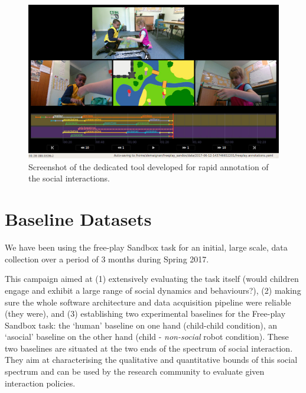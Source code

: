 \documentclass[sigconf]{acmart}
\begin{document}
\begin{figure}
    \centering
    \includegraphics[width=\columnwidth]{annotator}
    \caption{Screenshot of the dedicated tool developed for rapid annotation of
    the social interactions.}
    \label{annotator}
\end{figure}


\section{Baseline Datasets}
\label{sec:dataset}

We have been using the free-play Sandbox task for an initial, large scale, data
collection over a period of 3 months during Spring 2017.

This campaign aimed at (1) extensively evaluating the task itself (would
children engage and exhibit a large range of social dynamics and behaviours?),
(2) making sure the whole software architecture and data acquisition pipeline
were reliable (they were), and (3) establishing two experimental baselines for
the Free-play Sandbox task: the `human' baseline on one hand (child-child
condition), an `asocial' baseline on the other hand (child - \emph{non-social}
robot condition). These two baselines are situated at the two ends of the
spectrum of social interaction. They aim at characterising the qualitative and
quantitative bounds of this social spectrum and can be used by the research
community to evaluate given interaction policies.
\end{document}
